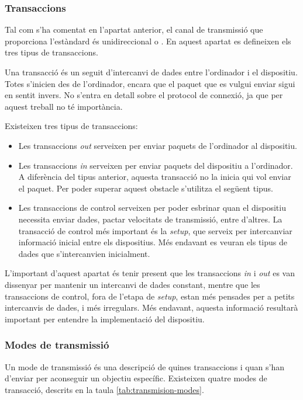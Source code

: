 \subsubsection*{Transaccions}

Tal com s'ha comentat en l'apartat anterior, el canal de transmissió que
proporciona l'estàndard és unidireccional o . En aquest
apartat es defineixen els tres tipus de transaccions.

Una transacció és un seguit d'intercanvi de dades entre l'ordinador i el
dispositiu. Totes s'inicien des de l'ordinador, encara que el paquet que es
vulgui enviar sigui en sentit invers. No s'entra en detall sobre el protocol de
connexió, ja que per aquest treball no té importància.

Existeixen tres tipus de transaccions:
\begin{itemize}
    \item Les transaccions \emph{out} serveixen per enviar paquets de
    l'ordinador al dispositiu.
    \item Les transaccions \emph{in} serveixen per enviar paquets del
    dispositiu a l'ordinador. A diferència del tipus anterior, aquesta
    transacció no la inicia qui vol enviar el paquet. Per poder
    superar aquest obstacle s'utilitza el següent tipus.
    \item Les transaccions de control serveixen per poder esbrinar quan el
    dispositiu necessita enviar dades, pactar velocitats de transmissió, entre
    d'altres. La transacció de control més important és la \emph{setup},
    que serveix per intercanviar informació inicial entre els dispositius. Més
    endavant es veuran els tipus de dades que s'intercanvien inicialment.
\end{itemize}

L'important d'aquest apartat és tenir present que les transaccions \emph{in} i
\emph{out} es van dissenyar per mantenir un intercanvi de dades constant,
mentre que les transaccions de control, fora de l'etapa de \emph{setup}, estan
més pensades per a petits intercanvis de dades, i més irregulars. Més endavant,
aquesta informació resultarà important per entendre la implementació del
dispositiu.

\subsubsection*{Modes de transmissió}

Un mode de transmissió és una descripció de quines transaccions i quan s'han
d'enviar per aconseguir un objectiu específic. Existeixen quatre modes
de transacció, descrits en la taula \ref{tab:transmision-modes}.

